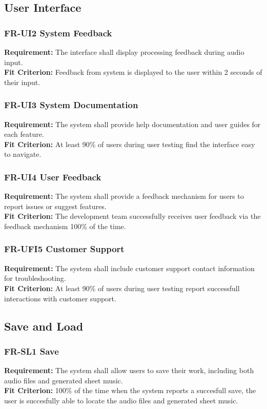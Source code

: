 \documentclass[12pt]{article}
\begin{document}
\subsection{User Interface}
\subsubsection*{FR-UI2 System Feedback}
\textbf{Requirement:} The interface shall display processing feedback during audio input. \\
\textbf{Fit Criterion:} Feedback from system is displayed to the user within 2 seconds of their input.
\subsubsection*{FR-UI3 System Documentation}
\textbf{Requirement:} The system shall provide help documentation and user guides for each feature. \\
\textbf{Fit Criterion:} At least 90\% of users during user testing find the interface easy to navigate.
\subsubsection*{FR-UI4 User Feedback}
\textbf{Requirement:} The system shall provide a feedback mechanism for users to report issues or suggest features. \\
\textbf{Fit Criterion:} The development team successfully receives user feedback via the feedback mechanism 100\% of the time.
\subsubsection*{FR-UFI5 Customer Support}
\textbf{Requirement:} The system shall include customer support contact information for troubleshooting. \\
\textbf{Fit Criterion:} At least 90\% of users during user testing report successfull interactions with customer support.

\subsection{Save and Load}
\subsubsection*{FR-SL1 Save}
\textbf{Requirement:} The system shall allow users to save their work, including both audio files and generated sheet music. \\
\textbf{Fit Criterion:} 100\% of the time when the system reports a succesfull save, the user is succesfully able to locate the audio files and generated sheet music.
\end{document}
